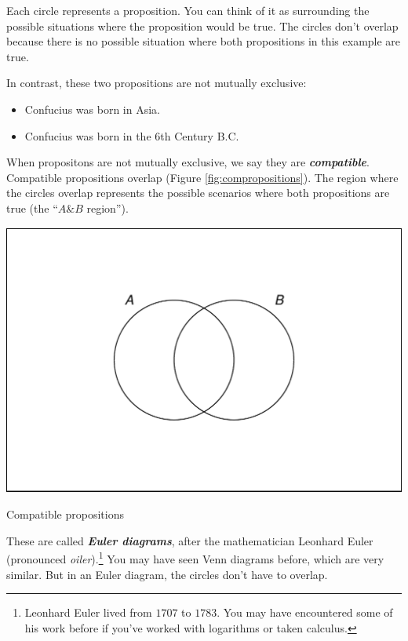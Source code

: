 \documentclass[justified]{tufte-book}
\providecommand{\tightlist}{%
  \setlength{\itemsep}{0pt}\setlength{\parskip}{0pt}}
\renewcommand{\wedge}{\mathbin{\&}}
\theoremstyle{definition}
\theoremstyle{definition}
\theoremstyle{definition}
\theoremstyle{remark}
\begin{document}
Each circle represents a proposition. You can think of it as surrounding the possible situations where the proposition would be true. The circles don't overlap because there is no possible situation where both propositions in this example are true.

In contrast, these two propositions are not mutually exclusive:

\begin{itemize}
\tightlist
\item
  Confucius was born in Asia.
\item
  Confucius was born in the 6th Century B.C.
\end{itemize}

When propositons are not mutually exclusive, we say they are \textbf{\emph{compatible}}. Compatible propositions overlap (Figure \ref{fig:compropositions}). The region where the circles overlap represents the possible scenarios where both propositions are true (the ``\(A \wedge B\) region'').

\begin{marginfigure}
\includegraphics{_main_files/figure-latex/compropositions-1} \caption[Compatible propositions]{Compatible propositions}\label{fig:compropositions}
\end{marginfigure}

These are called \textbf{\emph{Euler diagrams}}, after the mathematician Leonhard Euler (pronounced \emph{oiler}).\footnote{Leonhard Euler lived from \(1707\) to \(1783\). You may have encountered some of his work before if you've worked with logarithms or taken calculus.} You may have seen Venn diagrams before, which are very similar. But in an Euler diagram, the circles don't have to overlap.
\end{document}

